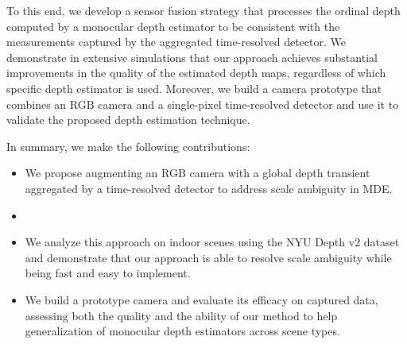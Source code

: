 

To this end, we develop a sensor fusion strategy that processes the ordinal
depth computed by a monocular depth estimator to be consistent with the
measurements captured by the aggregated time-resolved detector. We demonstrate in extensive
simulations that our approach achieves substantial improvements in the quality
of the estimated depth maps, regardless of which specific depth estimator is
used. Moreover, we build a camera prototype that combines an RGB camera and a single-pixel time-resolved detector and use it to validate the proposed depth estimation technique. %

In summary, we make the following contributions:
%
\begin{itemize}
	\item We propose augmenting an RGB camera with a global depth transient
    aggregated by a time-resolved detector to address scale ambiguity in MDE.
  \item {}
  \item We analyze this approach on indoor scenes using the NYU Depth v2 dataset
    and demonstrate that our approach is able to resolve scale ambiguity while
    being fast and easy to implement.
	\item We build a prototype camera and evaluate its efficacy on captured data,
    assessing both the quality and the ability of our method to help
    generalization of monocular depth estimators across scene types.
\end{itemize}



